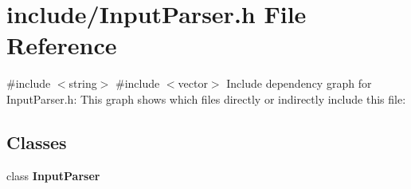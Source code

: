 \section{include/\+Input\+Parser.h File Reference}
\label{_input_parser_8h}
{\ttfamily \#include $<$string$>$}\newline
{\ttfamily \#include $<$vector$>$}\newline
Include dependency graph for Input\+Parser.\+h\+:
This graph shows which files directly or indirectly include this file\+:
\subsection*{Classes}
\begin{DoxyCompactItemize}
\item 
class \textbf{ Input\+Parser}
\end{DoxyCompactItemize}
